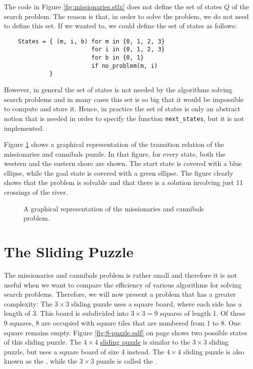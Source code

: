The code in Figure \ref{fig:missionaries.stlx} does not define the set of states $Q$ of the search problem.  The
reason is that, in order to solve the problem, we do not need to define this set.  If we wanted to, we could
define the set of states as follows: 
\begin{verbatim}
    States = { (m, i, b) for m in {0, 1, 2, 3}
                         for i in {0, 1, 2, 3}
                         for b in {0, 1} 
                         if no_problem(m, i)
             }
\end{verbatim}
However, in general the set of states is not needed by the algorithms solving search problems and in many cases
this set is so big that it would be impossible to compute and store it.  Hence, in practice the set of states is only an
abstract notion that is needed in order to specify the function \texttt{next\_states}, but it is not implemented.

Figure \ref{fig:missionaries.pdf} shows a graphical representation of the transition relation of the
missionaries and cannibals puzzle.  In that figure, for every state, both the western and the
eastern shore are shown.  The start state is covered with a blue ellipse, while the goal state is
covered with a green ellipse.  The figure clearly shows that the problem is solvable and that there
is a solution involving just 11 crossings of the river.
\eox

\begin{figure}[!ht]
  \centering
  \caption{A graphical representation of the missionaries and cannibals problem.}
  \label{fig:missionaries.pdf}
\end{figure}


\section{The Sliding Puzzle}
The missionaries and cannibals problem is rather small and therefore it is not useful when we want to compare
the efficiency of various algorithms for solving search problems.  Therefore, we will now present a problem
that has a greater complexity:  The $3 \times 3$ sliding puzzle uses a 
square board, where each side has a length of 3.  This board is subdivided into $3 \times 3 = 9$ squares of length 1.  Of
these 9 squares, 8 are occupied with square tiles that are numbered from 1 to 8.  One square remains
empty. Figure \ref{fig:8-puzzle.pdf} on page \pageref{fig:8-puzzle.pdf} shows two possible states of this
sliding puzzle.  The $4 \times 4$ \href{https://en.wikipedia.org/wiki/15_puzzle}{sliding puzzle}
is similar to the $3 \times 3$ sliding puzzle, but uses a square board of size 4
instead.  The $4 \times 4$ sliding puzzle is also known as the , while the $3 \times 3$ puzzle is
called the .  

